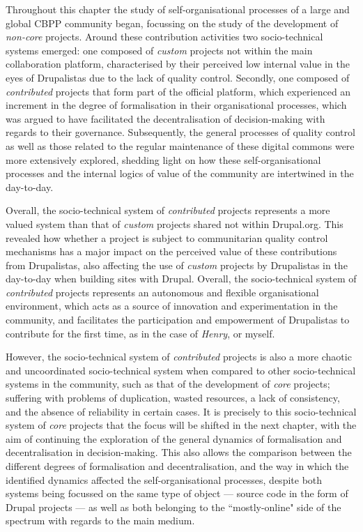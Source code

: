 Throughout this chapter the study of self-organisational processes of a large and global CBPP community began, focussing on the study of the development of \textit{non-core} projects. Around these contribution activities two socio-technical systems emerged: one composed of \textit{custom} projects not within the main collaboration platform, characterised by their perceived low internal value in the eyes of Drupalistas due to the lack of quality control. Secondly, one composed of \textit{contributed} projects that form part of the official platform, which experienced an increment in the degree of formalisation in their organisational processes, which was argued to have facilitated the decentralisation of decision-making with regards to their governance. Subsequently, the general processes of quality control as well as those related to the regular maintenance of these digital commons were more extensively explored, shedding light on how these self-organisational processes and the internal logics of value of the community are intertwined in the day-to-day.

Overall, the socio-technical system of \textit{contributed} projects represents a more valued system than that of \textit{custom} projects shared not within Drupal.org. This revealed how whether a project is subject to communitarian quality control mechanisms has a major impact on the perceived value of these contributions from Drupalistas, also affecting the use of \textit{custom} projects by Drupalistas in the day-to-day when building sites with Drupal. Overall, the socio-technical system of \textit{contributed} projects represents an autonomous and flexible organisational environment, which acts as a source of innovation and experimentation in the community, and facilitates the participation and empowerment of Drupalistas to contribute for the first time, as in the case of \textit{Henry}, or myself. 

However, the socio-technical system of \textit{contributed} projects is also a more chaotic and uncoordinated socio-technical system when compared to other socio-technical systems in the community, such as that of the development of \textit{core} projects; suffering with problems of duplication, wasted resources, a lack of consistency, and the absence of reliability in certain cases. It is precisely to this socio-technical system of \textit{core} projects that the focus will be shifted in the next chapter, with the aim of continuing the exploration of the general dynamics of formalisation and decentralisation in decision-making. This also allows the comparison between the different degrees of formalisation and decentralisation, and the way in which the identified dynamics affected the self-organisational processes, despite both systems being focussed on the same type of object --- source code in the form of Drupal projects --- as well as both belonging to the ``mostly-online" side of the spectrum with regards to the main medium.